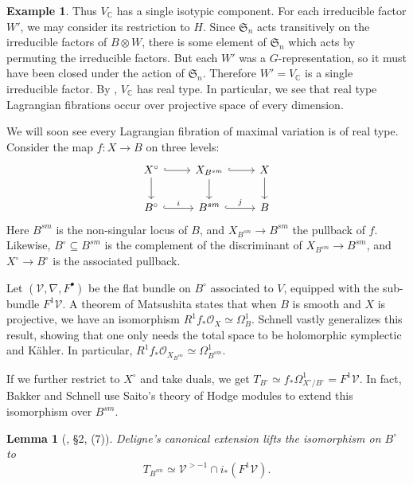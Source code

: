 \documentclass[12pt]{amsart}
\newcommand{\C}{\mathbb{C}}
\newtheorem{lemma}[theorem]{Lemma}
\theoremstyle{definition}
\newtheorem{example}[theorem]{Example}
\theoremstyle{remark}
\numberwithin{equation}{section}
\begin{document}
\begin{example}
Thus \(V_\C\) has a single isotypic component. For each irreducible factor \(W'\),
we may consider its restriction to \(H\). Since \(\mathfrak{S}_n\) acts transitively 
on the irreducible factors of \(B \otimes W\), there is some element of
\(\mathfrak{S}_n\) which acts by permuting the irreducible factors. But each \(W'\)
was a \(G\)-representation, so it must have been closed under the action of 
\(\mathfrak{S}_n\). Therefore \(W' = V_\C\) is a single irreducible factor. 
By , \(V_\C\) has real type.
In particular, we see that real type Lagrangian fibrations occur over projective
space of every dimension.
\end{example}

We will soon see every Lagrangian fibration of maximal variation is of real type.
Consider the map \(f: X \to B\) on three levels:
\begin{equation*}
\begin{tikzcd}
	{X^\circ} \arrow[hook]{r} \arrow{d} & {X_{B^{sm}}} \arrow[hook]{r} \arrow{d} & X \arrow{d}\\
	{B^\circ} \arrow[hook]{r}{i} & {B^{sm}} \arrow[hook]{r}{j} & B
\end{tikzcd}
\end{equation*}
Here \(B^{sm}\) is the non-singular locus of \(B\), and \(X_{B^{sm}} \to B^{sm}\) the 
pullback of \(f\). Likewise, \(B^\circ \subseteq B^{sm}\) is the complement of the
discriminant of \(X_{B^{sm}} \to B^{sm}\), and \(X^{\circ} \to B^\circ\) is the 
associated pullback.

Let $(\mathcal{V}, \nabla, F^{\bullet})$ be the flat bundle on \(B^\circ\)
associated to \(V\), equipped with the sub-bundle $F^1\mathcal{V}$. A theorem of 
Matsushita \cite[Theorem 1.2]{mats05} states that when \(B\) is smooth and 
\(X\) is projective, we have an isomorphism \(R^1 f_* \mathcal{O}_X \simeq \Omega_B^1\).
Schnell \cite[\S 4]{schnell23} vastly generalizes this result, showing that one only 
needs the total space to be holomorphic symplectic and K\"ahler. In particular,
\(R^1 f_* \mathcal{O}_{X_{B^{sm}}} \simeq \Omega_{B^{sm}}^1\).

If we further restrict to \(X^\circ\) and take duals, we get
\(T_{B^\circ} \simeq f_* \Omega_{X^\circ/B^\circ}^1 = F^1 \mathcal{V}.\)
In fact, Bakker and Schnell use Saito's theory of Hodge modules to extend this 
isomorphism over \(B^{sm}\).
\begin{lemma}[\cite{bak-sch23}, \S 2, (7)] \label{deligne-ext}
    Deligne's canonical extension lifts the isomorphism on \(B^\circ\) to
    \[T_{B^{sm}} \simeq \mathcal{V}^{>-1} \cap i_*(F^1 \mathcal{V}).\]
\end{lemma}
\end{document}
